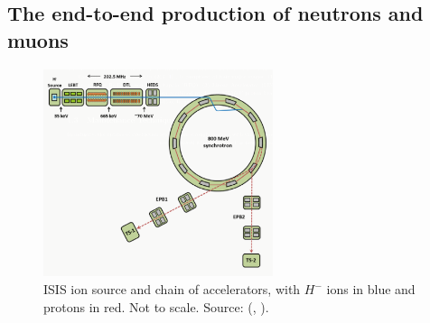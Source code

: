 \documentclass[10pt,oneside]{report}
\renewcommand{\citet}[1]{\citeauthor{#1}, \citeyear{#1}}
\begin{document}
\subsection{The end-to-end production of neutrons and muons}
\begin{figure}[htbp]
    \centering
    \includegraphics[width=0.6\textwidth]{ISIS2.png}
    \caption{ISIS ion source and chain of accelerators, with $H^-$ ions in blue and protons in red. Not to scale. Source: (\citet{2021practicalguide}).}\label{fig:isis2}
\end{figure}
\end{document}
